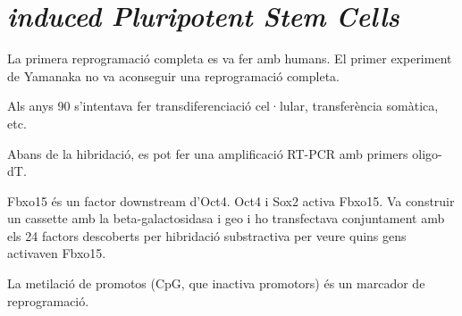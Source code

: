 \section{\textit{induced Pluripotent Stem Cells}}

La primera reprogramació completa es va fer amb humans. El primer experiment de Yamanaka no va aconseguir una reprogramació completa.

Als anys 90 s'intentava fer transdiferenciació cel·lular, transferència somàtica, etc.


Abans de la hibridació, es pot fer una amplificació RT-PCR amb primers oligo-dT.

Fbxo15 és un factor downstream d'Oct4. Oct4 i Sox2 activa Fbxo15. Va construir un cassette amb la beta-galactosidasa i geo i ho transfectava conjuntament amb els 24 factors descoberts per hibridació substractiva per veure quins gens activaven Fbxo15.

La metilació de promotos (CpG, que inactiva promotors) és un marcador de reprogramació.